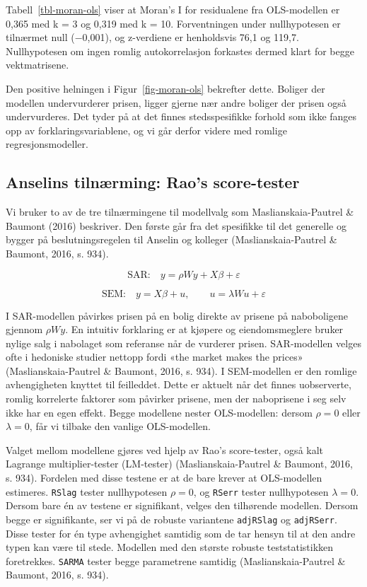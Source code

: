 \documentclass[
  norsk,
  a4paper,
]{article}
\begin{document}
Tabell~\ref{tbl-moran-ols} viser at Moran's I for residualene fra
OLS-modellen er 0,365 med k = 3 og 0,319 med k = 10. Forventningen under
nullhypotesen er tilnærmet null (−0,001), og z-verdiene er henholdsvis
76,1 og 119,7. Nullhypotesen om ingen romlig autokorrelasjon forkastes
dermed klart for begge vektmatrisene.

Den positive helningen i Figur~\ref{fig-moran-ols} bekrefter dette.
Boliger der modellen undervurderer prisen, ligger gjerne nær andre
boliger der prisen også undervurderes. Det tyder på at det finnes
stedsspesifikke forhold som ikke fanges opp av forklaringsvariablene, og
vi går derfor videre med romlige regresjonsmodeller.

\subsection{Anselins tilnærming: Rao's
score-tester}\label{anselins-tilnuxe6rming-raos-score-tester}

Vi bruker to av de tre tilnærmingene til modellvalg som
Maslianskaia-Pautrel \& Baumont (2016) beskriver. Den første går fra det
spesifikke til det generelle og bygger på beslutningsregelen til Anselin
og kolleger (Maslianskaia-Pautrel \& Baumont, 2016, s. 934).

\[\text{SAR:} \quad y = \rho W y + X\beta + \varepsilon\]

\[\text{SEM:} \quad y = X\beta + u, \qquad u = \lambda W u + \varepsilon\]

I SAR-modellen påvirkes prisen på en bolig direkte av prisene på
naboboligene gjennom \(\rho Wy\). En intuitiv forklaring er at kjøpere
og eiendomsmeglere bruker nylige salg i nabolaget som referanse når de
vurderer prisen. SAR-modellen velges ofte i hedoniske studier nettopp
fordi «the market makes the prices» (Maslianskaia-Pautrel \& Baumont,
2016, s. 934). I SEM-modellen er den romlige avhengigheten knyttet til
feilleddet. Dette er aktuelt når det finnes uobserverte, romlig
korrelerte faktorer som påvirker prisene, men der naboprisene i seg selv
ikke har en egen effekt. Begge modellene nester OLS-modellen: dersom
\(\rho = 0\) eller \(\lambda = 0\), får vi tilbake den vanlige
OLS-modellen.

Valget mellom modellene gjøres ved hjelp av Rao's score-tester, også
kalt Lagrange multiplier-tester (LM-tester) (Maslianskaia-Pautrel \&
Baumont, 2016, s. 934). Fordelen med disse testene er at de bare krever
at OLS-modellen estimeres. \texttt{RSlag} tester nullhypotesen
\(\rho = 0\), og \texttt{RSerr} tester nullhypotesen \(\lambda = 0\).
Dersom bare én av testene er signifikant, velges den tilhørende
modellen. Dersom begge er signifikante, ser vi på de robuste variantene
\texttt{adjRSlag} og \texttt{adjRSerr}. Disse tester for én type
avhengighet samtidig som de tar hensyn til at den andre typen kan være
til stede. Modellen med den største robuste teststatistikken
foretrekkes. \texttt{SARMA} tester begge parametrene samtidig
(Maslianskaia-Pautrel \& Baumont, 2016, s. 934).
\end{document}
